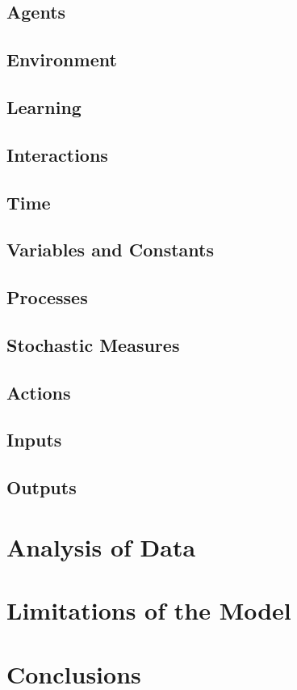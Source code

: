 \documentclass[a4paper, 10pt]{article}
\begin{document}
\subsection{Agents}
\subsection{Environment}
\subsection{Learning}
\subsection{Interactions}
\subsection{Time}
\subsection{Variables and Constants}
\subsection{Processes}
\subsection{Stochastic Measures}
\subsection{Actions}
\subsection{Inputs}
\subsection{Outputs}

\section{Analysis of Data}
\section{Limitations of the Model}
\section{Conclusions}
\newpage
\end{document}
